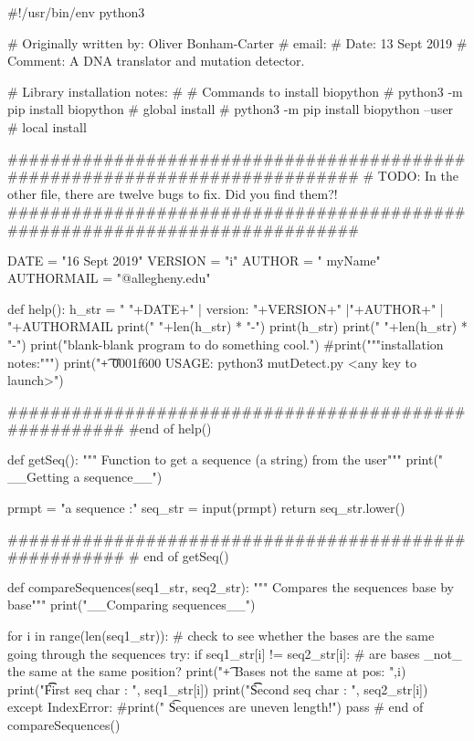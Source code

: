 
#!/usr/bin/env python3

# Originally written by: Oliver Bonham-Carter
# email:
# Date: 13 Sept 2019
# Comment: A DNA translator and mutation detector.

# Library installation notes:
#
# Commands to install biopython
# python3 -m pip install biopython # global install
# python3 -m pip install biopython –user # local install

############################################################################
# TODO: In the other file, there are twelve bugs to fix. Did you find them?!
############################################################################


DATE = "16 Sept 2019"
VERSION = "i"
AUTHOR = " myName"
AUTHORMAIL = "@allegheny.edu"

def help():
        h_str = "   "+DATE+" | version: "+VERSION+" |"+AUTHOR+" | "+AUTHORMAIL
        print("  "+len(h_str) * "-")
        print(h_str)
        print("  "+len(h_str) * "-")
        print("\n\tThe blank-blank program to do something cool.")
        #print("""\n\tLibrary installation notes:""")
        print("\t+ \U0001f600  USAGE: python3 mutDetect.py <any key to launch>")

######################################################
#end of help()


def getSeq():
    """ Function to get a sequence (a string) from the user"""
    print(" __Getting a sequence__")

    prmpt = "\tEnter a sequence :"
    seq_str = input(prmpt)
    return seq_str.lower()

######################################################
# end of getSeq()


def compareSequences(seq1_str, seq2_str):
    """ Compares the sequences base by base"""
    print("\n __Comparing sequences__")

    for i in range(len(seq1_str)):
        # check to see whether the bases are the same going through the sequences
        try:
            if seq1_str[i] != seq2_str[i]: # are bases _not_ the same at the same position?
                print("\t + Bases not the same at pos: ",i)
                print("\t\t First seq char   : ", seq1_str[i])
                print("\t\t Second  seq char : ", seq2_str[i])
        except IndexError:
            #print(" \t Sequences are uneven length!")
            pass
# end of compareSequences()

